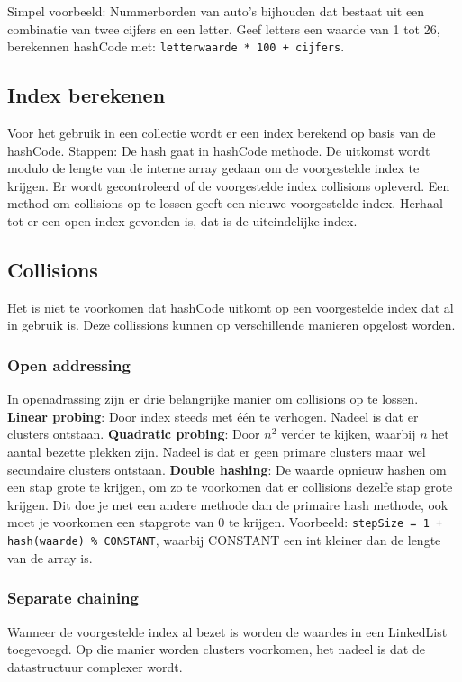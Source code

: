 Simpel voorbeeld:
Nummerborden van auto's bijhouden dat bestaat uit een combinatie van twee cijfers en een letter.
Geef letters een waarde van 1 tot 26, berekennen hashCode met: \texttt{letterwaarde * 100 + cijfers}.

\subsection{Index berekenen}
Voor het gebruik in een collectie wordt er een index berekend op basis van de hashCode.
Stappen:
De hash gaat in hashCode methode.
De uitkomst wordt modulo de lengte van de interne array gedaan om de voorgestelde index te krijgen.
Er wordt gecontroleerd of de voorgestelde index collisions opleverd.
Een method om collisions op te lossen geeft een nieuwe voorgestelde index.
Herhaal tot er een open index gevonden is, dat is de uiteindelijke index.

\subsection{Collisions}
Het is niet te voorkomen dat hashCode uitkomt op een voorgestelde index dat al in gebruik is. 
Deze collissions kunnen op verschillende manieren opgelost worden.

\subsubsection{Open addressing}
In openadrassing zijn er drie belangrijke manier om collisions op te lossen.
\textbf{Linear probing}: Door index steeds met \'e\'en te verhogen.
Nadeel is dat er clusters ontstaan.
\textbf{Quadratic probing}: Door $n^2$ verder te kijken, waarbij $n$ het aantal bezette plekken zijn.
Nadeel is dat er geen primare clusters maar wel secundaire clusters ontstaan.
\textbf{Double hashing}: De waarde opnieuw hashen om een stap grote te krijgen, om zo te voorkomen dat er collisions dezelfe stap grote krijgen.
Dit doe je met een andere methode dan de primaire hash methode, ook moet je voorkomen een stapgrote van 0 te krijgen.
Voorbeeld: \texttt{stepSize = 1 + hash(waarde) \% CONSTANT}, waarbij CONSTANT een int kleiner dan de lengte van de array is.

\subsubsection{Separate chaining}
Wanneer de voorgestelde index al bezet is worden de waardes in een LinkedList toegevoegd.
Op die manier worden clusters voorkomen, het nadeel is dat de datastructuur complexer wordt.
